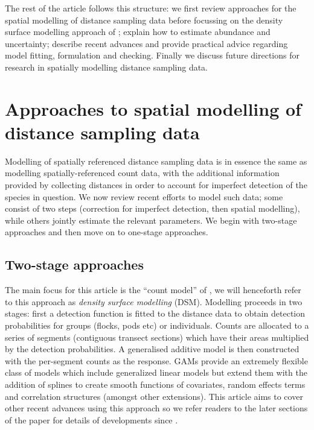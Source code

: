 \documentclass[a4paper,12pt]{article}
\begin{document}
The rest of the article follows this structure: we first review approaches for the spatial modelling of distance sampling data before focussing on the density surface modelling approach of \cite{Hedley:2004et}; explain how to estimate abundance and uncertainty; describe recent advances and provide practical advice regarding model fitting, formulation and checking. Finally we discuss future directions for research in spatially modelling distance sampling data.


\section*{Approaches to spatial modelling of distance sampling data}
\label{s:approaches}

Modelling of spatially referenced distance sampling data is in essence the same as modelling spatially-referenced count data, with the additional information provided by collecting distances in order to account for imperfect detection of the species in question. We now review recent efforts to model such data; some consist of two steps (correction for imperfect detection, then spatial modelling), while others jointly estimate the relevant parameters. We begin with two-stage approaches and then move on to one-stage approaches.

\subsection*{Two-stage approaches}

The main focus for this article is the ``count model'' of \cite{Hedley:2004et}, we will henceforth refer to this approach as \textit{density surface modelling} (DSM). Modelling proceeds in two stages: first a detection function is fitted to the distance data to obtain detection probabilities for groups (flocks, pods etc) or individuals. Counts are allocated to a series of segments (contiguous transect sections) which have their areas multiplied by the detection probabilities. A generalised additive model \cite[GAM; e.g.][]{Wood:2006wz} is then constructed with the per-segment counts as the response. GAMs provide an extremely flexible class of models which include generalized linear models \citep[GLMs;][]{McCullagh:1989ux} but extend them with the addition of splines to create smooth functions of covariates, random effects terms and correlation structures (amongst other extensions). This article aims to cover other recent advances using this approach so we refer readers to the later sections of the paper for details of developments since \cite{Hedley:2004et}.
\end{document}
